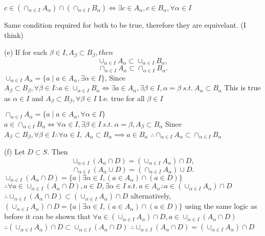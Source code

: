 $c \in (\cap_{\alpha \in I} A_{\alpha}) \cap (\cap_{\alpha \in I} B_{\alpha}) \iff \exists c \in A_{\alpha}, c \in B_{\alpha}, \forall \alpha \in I $

Same condition required for both to be true, therefore they are equivelant. (I think)

(e) If for each $\beta \in I, A_{\beta} \subset B_{\beta}, then$ $$ \cup_{\alpha \in I} A_{\alpha} \subset \cup_{\alpha \in I} B_{\alpha},$$ $$ \cap_{\alpha \in I } A_{\alpha} \subset \cap_{\alpha \in I } B_{\alpha}.$$ 
$\cup_{\alpha \in I} A_{\alpha} = \{ a \mid a \in A_{\alpha}, \exists \alpha \in I \}$, 
Since $A_{\beta} \subset B_{\beta}, \forall \beta \in I \therefore a \in \cup_{\alpha \in I} B_{\alpha} \iff \exists a \in A_{\alpha}, \exists \beta \in I, \alpha = \beta \ s.t. \  A_{\alpha} \subset B_{\alpha}$
This is true as $\alpha \in I$ and $A_{\beta} \subset B_{\beta}, \forall \beta \in I$ I.e. true for all $\beta \in I$

$\cap_{\alpha \in I} A_{\alpha} = \{ a \mid a \in  A_{\alpha}, \forall \alpha \in I\} $
$a \in \cap_{\alpha \in I} B_{\alpha} \iff \forall \alpha \in I ,\exists \beta \in I \ s.t. \ \alpha = \beta,A_{\beta} \subset B_{\alpha}$
Since $A_{\beta} \subset B_{\beta}, \forall \beta \in I \therefore \forall \alpha \in I,  \ A_{\alpha} \subset B_{\alpha}  \implies a \in B_{\alpha}$
$\therefore \cap_{\alpha \in I } A_{\alpha} \subset \cap_{\alpha \in I } B_{\alpha}$

(f) Let $D \subset S$. Then $$\cup_{\alpha \in I} (A_{\alpha} \cap D) = (\cup_{\alpha \in I} A_{\alpha}) \cap D,$$ $$ \cap_{\alpha \in I } (A_{\alpha} \cup D) = (\cap_{\alpha \in I} A_{\alpha} ) \cup D.$$
$\cup_{\alpha \in I}(A_{\alpha} \cap D) = \{ a \mid \exists \alpha \in I, (a \in A_{\alpha}) \cap (a \in D)\}$
$\therefore \forall a \in \cup_{\alpha \in I}(A_{\alpha} \cap D), a \in D, \exists \alpha \in I \ s.t.\ a \in A_{\alpha} \therefore a \in (\cup_{\alpha \in I}A_{\alpha}) \cap D$
$\therefore \cup_{\alpha \in I} (A_{\alpha} \cap D) \subset (\cup_{\alpha \in I} A_{\alpha}) \cap D$
alternatively, $(\cup_{\alpha \in  I} A_{\alpha}) \cap D = \{ a \mid \exists \alpha \in I, (a \in A_{\alpha}) \cap (a \in D)\}$
using the same logic as before it can be shown that $\forall a \in (\cup_{\alpha \in  I} A_{\alpha}) \cap D , a \in \cup_{\alpha \in I}(A_{\alpha} \cap D)$
$\therefore (\cup_{\alpha \in I} A_{\alpha}) \cap D \subset \cup_{\alpha \in I} (A_{\alpha} \cap D)$
$\therefore \cup_{\alpha \in I} (A_{\alpha} \cap D) = (\cup_{\alpha \in I} A_{\alpha}) \cap D$


